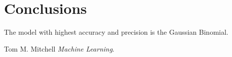 \documentclass[12pt]{article}
\begin{document}
\section{Conclusions}
The model with highest accuracy and precision is the Gaussian Binomial.

\newpage
\begin{thebibliography}{10}
	
	Tom M. Mitchell \textsl{Machine Learning}.
	
\end{thebibliography}
\end{document}
